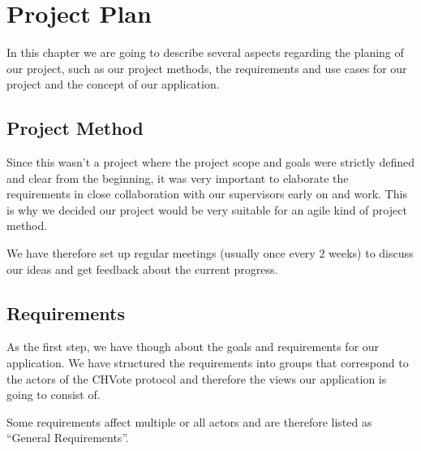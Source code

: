 
\newcommand{\zs}[0]{\cellcolor{zscol}}				%
\newcommand{\zi}[0]{\cellcolor{zicol}}				%
\newcommand{\ms}[1]{
	\makebox[.7cm][r]{
		\tikz[baseline=(char.base)]{
			\node[shape=circle,draw,inner sep=.02cm,fill=black,text=white] (char) { #1 };
		}
	}
}

\newcommand{\sq}[1]{\textcolor{#1}{\rule{.3cm}{.3cm}}}

\newcommand{\phase}[1]{
	\multicolumn{22}{l}{} \\
	\multicolumn{22}{l}{\cellcolor{gray!20}\textbf{#1}} \\ \hline
}

\chapter{Project Plan}
In this chapter we are going to describe several aspects regarding the planing of our project, such as our project methods, the requirements and use cases for our project and the concept of our application. 
\section{Project Method}
Since this wasn't a project where the project scope and goals were strictly defined and clear from the beginning, it was very important to elaborate the requirements in close collaboration with our supervisors early on and work. This is why we decided our project would be very suitable for an agile kind of project method. 

We have therefore set up regular meetings (usually once every 2 weeks) to discuss our ideas and get feedback about the current progress.

\section{Requirements}
As the first step, we have though about the goals and requirements for our application. We have structured the requirements into groups that correspond to the actors of the CHVote protocol and therefore the views our application is going to consist of.

Some requirements affect multiple or all actors and are therefore listed as "`General Requirements"'.
